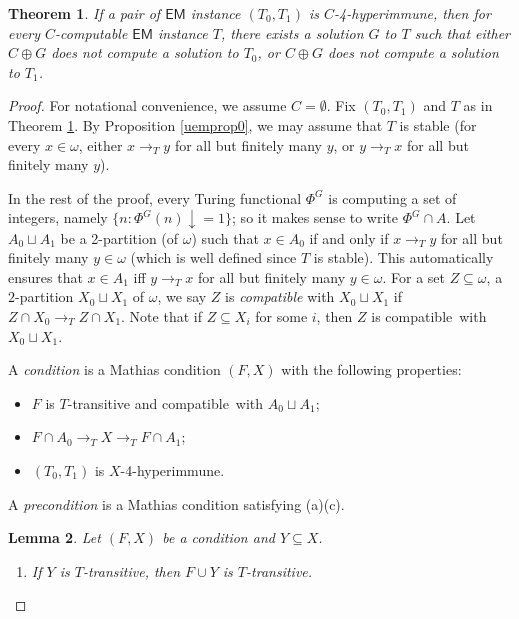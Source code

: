 \documentclass{amsart}
\newtheorem{theorem}{Theorem}[section]
\newtheorem{lemma}[theorem]{Lemma}
\theoremstyle{definition}
\theoremstyle{remark}
\numberwithin{equation}{section}
\theoremstyle{noparens}
\def\msf{\mathsf}
\def\r{\rightarrow}
\def\iatfshyp{4-hyperimmune}
\def\compatible{compatible}
\begin{document}
\begin{theorem}\label{uemth0}
If a pair of $\msf{EM}$ instance
$(T_0,T_1)$ is $C$-\iatfshyp, then for every
$C$-computable $\msf{EM}$ instance $T$, there exists
a  solution $G$ to $T$ such that
either $C\oplus G$ does not compute a solution to $T_0$,
or $C\oplus G$ does not compute a solution to $T_1$.
\end{theorem}
\begin{proof}
For notational convenience,  we assume
$C=\emptyset$.
Fix $(T_0,T_1)$ and $T$ as in Theorem \ref{uemth0}.
By Proposition \ref{uemprop0}, we may assume that
$T$ is stable (for every $x\in\omega$, either $x\rightarrow_T y$ for all but finitely many $y$,
or $y\r_T x$ for all but finitely many $y$).

In the rest of the proof, every Turing functional $\Phi^G$ is computing a set of integers,
namely $\{n: \Phi^G(n)\downarrow =1\}$;
so it makes sense to write $\Phi^G\cap A$.
Let $A_0\sqcup A_1$ be a 2-partition (of $\omega$) such that
 $x\in A_0$ if and only if $x\r_T y$ for all but finitely many
$y\in \omega$ (which is well defined since $T$ is stable).
This automatically ensures that $x\in A_1$ iff $y\r_T x$ for all but finitely many
$y\in\omega$.
For a set $Z\subseteq \omega$, a $2$-partition
$X_0\sqcup X_1$ of $\omega$, we say $Z$ is \emph{\compatible} with $X_0\sqcup X_1$ if
$Z\cap X_0\r_T Z\cap X_1$.
Note that if $Z\subseteq X_i$ for some $i$, then $Z$ is \compatible\ with $X_0\sqcup X_1$.

A \emph{condition} is a Mathias condition $(F,X)$ with the following properties:
\begin{itemize}
\item [(a)] $F$ is  $T$-transitive and \compatible\ with $A_0\sqcup A_1$;
\item [(b)]
$F\cap A_0\r_T X\r_T F\cap A_1$;

\item [(c)] $(T_0,T_1)$ is $X$-\iatfshyp.


\end{itemize}
A \emph{precondition} is a Mathias condition satisfying (a)(c).

\begin{lemma}\label{uemlem3}
Let  $(F,X)$ be a condition and $Y\subseteq X$.
\begin{enumerate}



\item If $Y$ is  $T$-transitive, then
 $F\cup Y$ is  $T$-transitive.


\end{enumerate}
\end{lemma}
\end{proof}
\end{document}
